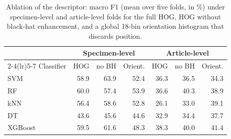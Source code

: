 \begin{table}[t]
\centering
\setlength{\tabcolsep}{3.5pt}
\caption{Ablation of the descriptor: macro F1 (mean over five folds, in \%) under specimen-level and article-level folds for the full HOG, HOG without black-hat enhancement, and a global 18-bin orientation histogram that discards position.}
\label{tab:ablation}
\begin{tabular}{l rrr rrr}
\toprule
 & \multicolumn{3}{c}{Specimen-level} & \multicolumn{3}{c}{Article-level} \\
\cmidrule(lr){2-4}\cmidrule(lr){5-7}
Classifier & HOG & no BH & Orient. & HOG & no BH & Orient. \\
\midrule
SVM & 58.9 & 63.9 & 52.4 & 36.3 & 36.5 & 34.3 \\
RF & 60.0 & 57.4 & 53.9 & 36.6 & 40.3 & 38.9 \\
kNN & 56.4 & 58.6 & 52.8 & 26.1 & 33.0 & 39.1 \\
DT & 43.6 & 45.6 & 44.6 & 32.9 & 34.4 & 37.7 \\
XGBoost & 59.5 & 61.6 & 48.3 & 38.3 & 40.0 & 41.4 \\
\bottomrule
\end{tabular}
\end{table}
